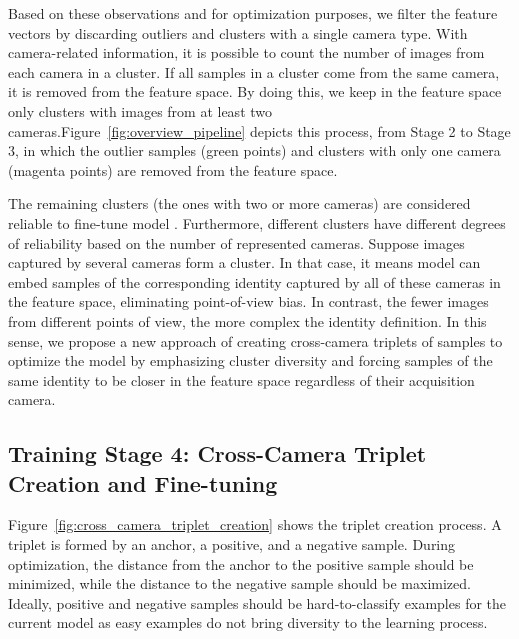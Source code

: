 \documentclass[journal]{IEEEtran}
\begin{document}
Based on these observations and for optimization purposes, we filter the feature vectors by discarding outliers and clusters with a single camera type.
With camera-related information, it is possible to count the number of images from each camera in a cluster. If all samples in a cluster come from the same camera, it is removed from the feature space. By doing this, we keep in the feature space only clusters with images from at least two cameras.Figure~\ref{fig:overview_pipeline} depicts this process, from Stage 2 to Stage 3, in which the outlier samples (green points) and clusters with only one camera (magenta points) are removed from the feature space. 

The remaining clusters (the ones with two or more cameras) are considered reliable to fine-tune model . Furthermore, different clusters have different degrees of reliability based on the number of represented cameras. 
Suppose images captured by several cameras form a cluster. In that case, it means model  can embed samples of the corresponding identity captured by all of these cameras in the feature space, eliminating point-of-view bias. In contrast, the fewer images from different points of view, the more complex the identity definition.
In this sense, we propose a new approach of creating cross-camera triplets of samples to optimize the model by emphasizing cluster diversity and forcing samples of the same identity to be closer in the feature space regardless of their acquisition camera.





\subsection{Training Stage 4: Cross-Camera Triplet Creation and Fine-tuning}

Figure~\ref{fig:cross_camera_triplet_creation} shows the triplet creation process. A triplet is formed by an anchor, a positive, and a negative sample. 
During optimization, the distance from the anchor to the positive sample should be minimized, while the distance to the negative sample should be maximized. Ideally, positive and negative samples should be hard-to-classify examples for the current model  as easy examples do not bring diversity to the learning process. 
\end{document}
